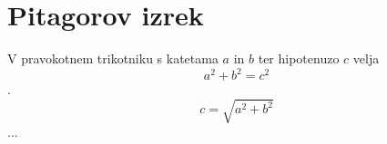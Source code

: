 \documentclass{article}
\begin{document}
\section*{Pitagorov izrek}
V pravokotnem trikotniku s katetama \(a\) in \(b\) ter hipotenuzo \(c\) velja
\[ a^2 + b^2 = c^2 \].
\[ c = \sqrt{a^2 + b^2} \] ...
\end{document}
